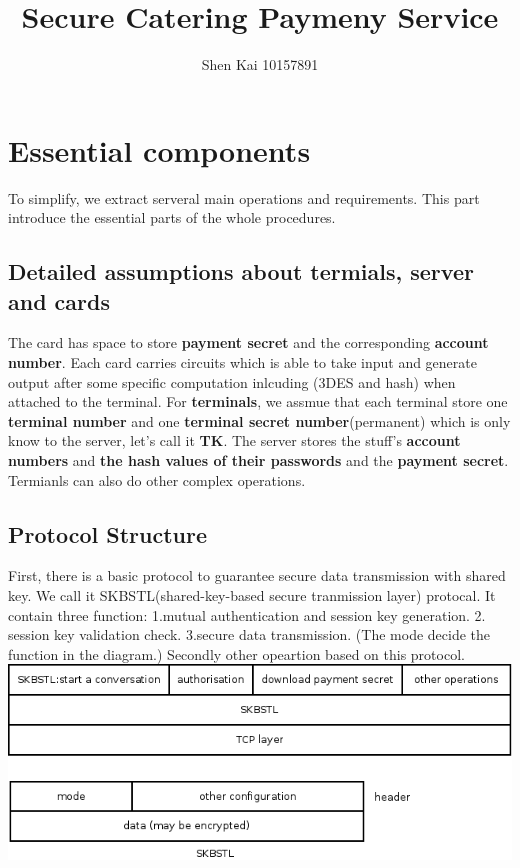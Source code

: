 \documentclass{article}
\title{Secure Catering Paymeny Service}
\author{Shen Kai 10157891}
\begin{document}
    \maketitle
    \section{Essential components}
To simplify, we extract serveral main operations and requirements. 
This part introduce the essential parts of the whole procedures.
        \subsection*{Detailed assumptions about termials, server and cards}
The card has space to store \textbf{payment secret} and the corresponding \textbf{account number}. 
Each card carries  circuits which is able to take input and generate output after some specific computation inlcuding (3DES and hash) when attached to the terminal.
For \textbf{terminals}, we assmue that each terminal store one \textbf{terminal number} and one \textbf{terminal secret number}(permanent) which is only know to the server, let's call it \textbf{TK}. 
The server stores the stuff's \textbf{account numbers} and \textbf{the hash values of their passwords} and the \textbf{payment secret}.
Termianls can also do other complex operations.
        \newline
        \subsection*{Protocol Structure}
First, there is a basic protocol to guarantee secure data transmission with shared key. 
We call it SKBSTL(shared-key-based secure tranmission layer) protocal. 
It contain three function: 
1.mutual authentication and session key generation. 
2. session key validation check. 
3.secure data transmission. (The mode decide the function in the diagram.)
Secondly other opeartion based on this protocol. 
        \newline
\includegraphics[width=6in]{Diagram1.png}
        \newline
\end{document}

